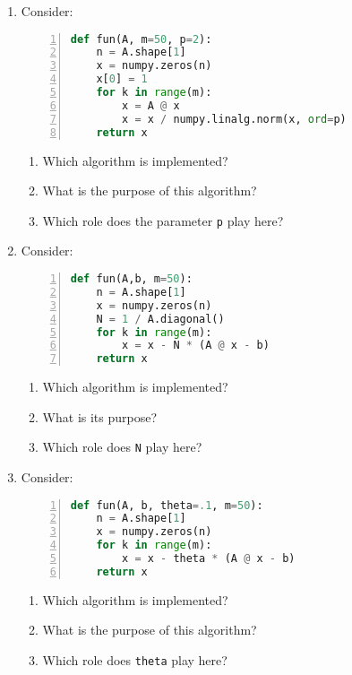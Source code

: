 \vspace*{-0.5cm}
\begin{enumerate}
\item Consider:
\begin{lstlisting}[language=python,numbers=left]
def fun(A, m=50, p=2):
    n = A.shape[1]
    x = numpy.zeros(n)
    x[0] = 1	
    for k in range(m):
        x = A @ x
        x = x / numpy.linalg.norm(x, ord=p)
    return x
\end{lstlisting}
\begin{enumerate}
	\item Which algorithm is implemented? 
	\item What is the purpose of this algorithm?
	\item Which role does the parameter \texttt{p} play here?
\end{enumerate}
	\item Consider:
\begin{lstlisting}[language=python,numbers=left]
def fun(A,b, m=50):
    n = A.shape[1]
    x = numpy.zeros(n)
    N = 1 / A.diagonal()		
    for k in range(m):
        x = x - N * (A @ x - b)
    return x
\end{lstlisting}
	\begin{enumerate}
		\item Which algorithm is implemented?
		\item What is its purpose? 
		\item Which role does \verb|N| play here?
	\end{enumerate}

\item Consider:
\begin{lstlisting}[language=python,numbers=left]
def fun(A, b, theta=.1, m=50):
    n = A.shape[1]
    x = numpy.zeros(n)		
    for k in range(m):
        x = x - theta * (A @ x - b)
    return x
\end{lstlisting}
\begin{enumerate}
	\item Which algorithm is implemented? 
	\item What is the purpose of this algorithm?
	\item Which role does \verb|theta| play here?
\end{enumerate}
\end{enumerate}
 